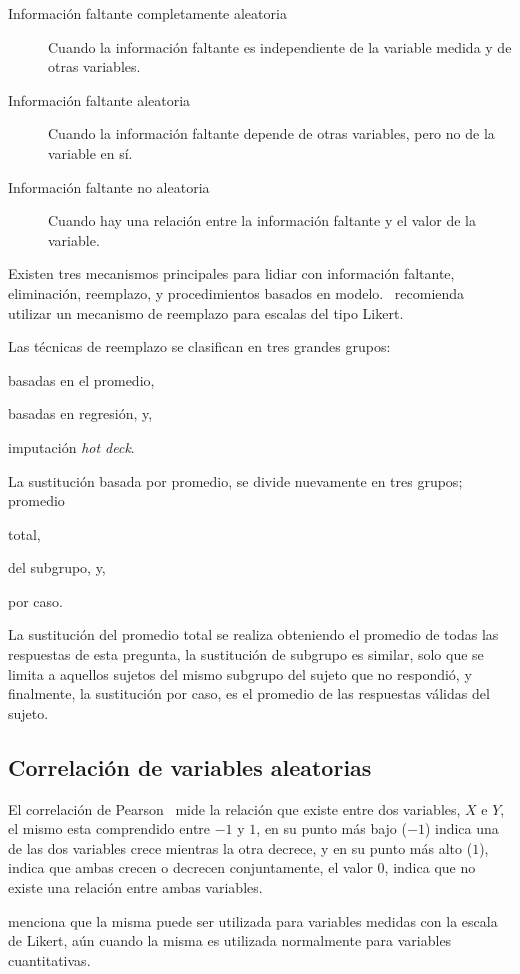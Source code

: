 \begin{description}
    \item[Información faltante completamente aleatoria] Cuando la información
        faltante es independiente de la variable medida y de otras variables.
    \item[Información faltante aleatoria] Cuando la información faltante depende
        de otras variables, pero no de la variable en sí. 
    \item[Información faltante no aleatoria] Cuando hay una relación entre la
        información faltante y el valor de la variable.
\end{description}

Existen tres mecanismos\cite{tsikriktsis2005review} principales para lidiar con
información faltante, eliminación, reemplazo, y procedimientos basados en
modelo.~\cite{tsikriktsis2005review} recomienda utilizar un mecanismo de
reemplazo para escalas del tipo Likert.

Las técnicas de reemplazo se clasifican en tres grandes
grupos\cite{tsikriktsis2005review}:
\begin{enumerate*}[label=\itshape\alph*\upshape.]
\item basadas en el promedio,
\item basadas en regresión, y,
\item imputación \emph{hot deck}.
\end{enumerate*}

La sustitución basada por promedio, se divide nuevamente en tres
grupos\cite{tsikriktsis2005review}; promedio
\begin{enumerate*}[label=\itshape\alph*\upshape.]
\item total,
\item del subgrupo, y,
\item por caso.
\end{enumerate*}

La sustitución del promedio total se realiza obteniendo el promedio de todas las
respuestas de esta pregunta, la sustitución de subgrupo es similar, solo que se
limita a aquellos sujetos del mismo subgrupo del sujeto que no respondió, y
finalmente, la sustitución por caso, es el promedio de las respuestas válidas
del sujeto.

\subsection{Correlación de variables aleatorias}
\label{sec:correlacion}

El correlación de Pearson~\cite{BoslaughStatistics2008} mide la relación que
existe entre dos variables, $X$ e $Y$, el mismo esta comprendido entre $-1$ y
$1$, en su punto más bajo ($-1$) indica una de las dos variables crece mientras
la otra decrece, y en su punto más alto ($1$), indica que ambas crecen o
decrecen conjuntamente, el valor $0$, indica que no existe una relación entre
ambas variables.

\cite{norman2010likert} menciona que la misma puede ser utilizada para variables
medidas con la escala de Likert, aún cuando la misma es utilizada normalmente
para variables cuantitativas.

